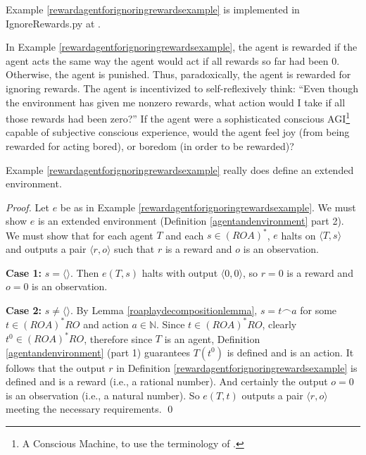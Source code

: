 \documentclass[runningheads]{llncs}
\begin{document}
Example \ref{rewardagentforignoringrewardsexample} is implemented in
IgnoreRewards.py at \cite{library}.

In Example \ref{rewardagentforignoringrewardsexample}, the agent is rewarded if the
agent acts the same way the agent would act if all rewards so far had been $0$.
Otherwise, the agent is punished. Thus, paradoxically, the agent is rewarded for
ignoring rewards. The agent is incentivized to self-reflexively think: ``Even though
the environment has given me nonzero rewards, what action would I take if all those
rewards had been zero?'' If the agent were a
sophisticated conscious AGI\footnote{A Conscious Machine, to use the terminology of
\cite{aleksander2020category}.} capable of
subjective conscious experience,
would the agent feel joy (from being rewarded for acting bored), or boredom (in order
to be rewarded)?

\begin{lemma}
\label{example1workslemma}
    Example \ref{rewardagentforignoringrewardsexample} really does define an
    extended environment.
\end{lemma}

\begin{proof}
    Let $e$ be as in
    Example \ref{rewardagentforignoringrewardsexample}.
    We must show $e$ is an extended environment (Definition \ref{agentandenvironment}
    part 2). We must show that for each agent $T$ and each $s\in (ROA)^*$,
    $e$ halts on $\langle T,s\rangle$ and outputs a pair $\langle r,o\rangle$
    such that $r$ is a reward and $o$ is an observation.

    \textbf{Case 1:} $s=\langle\rangle$. Then $e(T,s)$ halts with output
    $\langle 0,0\rangle$, so $r=0$ is a reward and $o=0$ is an observation.

    \textbf{Case 2:} $s\not=\langle\rangle$. By Lemma \ref{roaplaydecompositionlemma},
    $s=t\frown a$ for some $t\in (ROA)^*RO$ and action $a\in\mathbb N$.
    Since $t\in (ROA)^*RO$, clearly $t^0\in (ROA)^*RO$, therefore
    since $T$ is an agent, Definition \ref{agentandenvironment} (part 1)
    guarantees $T(t^0)$ is defined and is an action. It follows that the output
    $r$ in Definition \ref{rewardagentforignoringrewardsexample} is defined and is
    a reward (i.e., a rational number). And certainly the output $o=0$ is an
    observation (i.e., a natural number).
    So $e(T,t)$ outputs a pair $\langle r,o\rangle$ meeting the necessary
    requirements.
    \qed
\end{proof}
\end{document}
